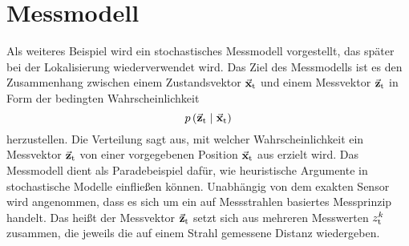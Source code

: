 \section{Messmodell}
Als weiteres Beispiel wird ein stochastisches Messmodell vorgestellt, das später bei der Lokalisierung wiederverwendet wird. Das Ziel des Messmodells ist es den Zusammenhang zwischen einem Zustandsvektor $\vec{\mathbf{x}}_{\text{t}}$ und einem Messvektor $\vec{\mathbf{z}}_{\text{t}}$ in Form der bedingten Wahrscheinlichkeit
\begin{equation}
p\left({\vec{\mathbf{z}}_{\text{t}}} \hspace{1mm} \vert \hspace{1mm} {\vec{\mathbf{x}}_{\text{t}}}\right)
\end{equation}
herzustellen. Die Verteilung sagt aus, mit welcher Wahrscheinlichkeit ein Messvektor $\vec{\mathbf{z}}_{\text{t}}$ von einer vorgegebenen Position $\vec{\mathbf{x}}_{\text{t}}$ aus erzielt wird. Das Messmodell dient als Paradebeispiel dafür, wie heuristische Argumente in stochastische Modelle einfließen können. Unabhängig von dem exakten Sensor wird angenommen, dass es sich um ein auf Messstrahlen basiertes Messprinzip handelt. Das heißt der Messvektor $\vec{\mathbf{z}}_{\text{t}}$ setzt sich aus mehreren Messwerten $z^k_{\text{t}}$ zusammen, die jeweils die auf einem Strahl gemessene Distanz wiedergeben. 

